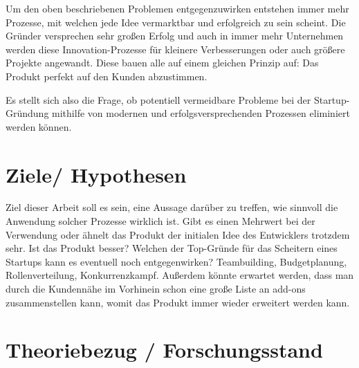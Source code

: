 Um den oben beschriebenen Problemen entgegenzuwirken entstehen immer mehr Prozesse, mit welchen jede Idee vermarktbar und erfolgreich zu sein scheint. Die Gründer versprechen sehr großen Erfolg und auch in immer mehr Unternehmen werden diese Innovation-Prozesse für kleinere Verbesserungen oder auch größere Projekte angewandt. Diese bauen alle auf einem gleichen Prinzip auf: Das Produkt perfekt auf den Kunden abzustimmen.

Es stellt sich also die Frage, ob potentiell vermeidbare Probleme bei der Startup-Gründung mithilfe von modernen und erfolgsversprechenden Prozessen eliminiert werden können. 

\section{Ziele/ Hypothesen}

Ziel dieser Arbeit soll es sein, eine Aussage darüber zu treffen, wie sinnvoll die Anwendung solcher Prozesse wirklich ist. Gibt es einen Mehrwert bei der Verwendung oder ähnelt das Produkt der initialen Idee des Entwicklers trotzdem sehr. Ist das Produkt besser? Welchen der Top-Gründe für das Scheitern eines Startups kann es eventuell noch entgegenwirken? Teambuilding, Budgetplanung, Rollenverteilung, Konkurrenzkampf.
Außerdem könnte erwartet werden, dass man durch die Kundennähe im Vorhinein schon eine große Liste an add-ons zusammenstellen kann, womit das Produkt immer wieder erweitert werden kann.

\section{Theoriebezug / Forschungsstand}

